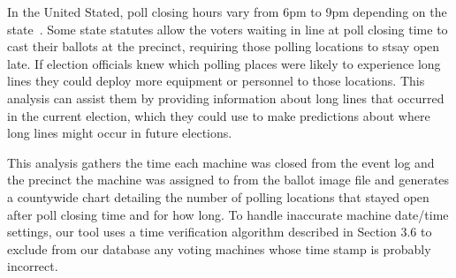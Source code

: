 In the United Stated, poll closing hours vary from 6pm to 9pm depending on the
state~\cite{Info2007}. Some state statutes allow the voters waiting in
line at poll closing time to cast their ballots at the precinct, requiring those
polling locations to stsay open late. If election officials knew which polling
places were likely to 
experience long lines they could deploy more equipment or personnel to
those locations. This analysis can assist them by providing
information about long lines that occurred in the current election, which they
could use to make predictions about where
long lines might occur in future elections.

This analysis gathers the time each machine was closed from the event log and
the precinct the machine was assigned to from the ballot image file
and generates a countywide chart detailing the number of polling
locations that stayed open after poll closing time and for how long. To handle
inaccurate machine date/time settings, our tool uses a time verification
algorithm described in Section 3.6 to exclude from our database any voting
machines whose time stamp is probably incorrect. 

